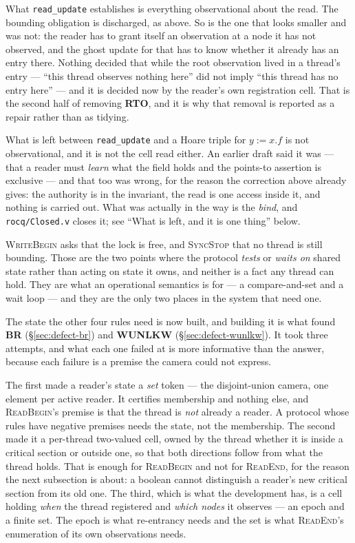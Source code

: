 What \texttt{read\_update} establishes is everything observational about the
read.  The bounding obligation is discharged, as above.  So is the one that
looks smaller and was not: the reader has to grant itself an observation at a
node it has not observed, and the ghost update for that has to know whether it
already has an entry there.  Nothing decided that while the root observation
lived in a thread's entry --- ``this thread observes nothing here'' did not
imply ``this thread has no entry here'' --- and it is decided now by the
reader's own registration cell.  That is the second half of removing
\textbf{RTO}, and it is why that removal is reported as a repair rather than as
tidying.

What is left between \texttt{read\_update} and a Hoare triple for $y := x.f$ is
not observational, and it is not the cell read either.  An earlier draft said
it was --- that a reader must \emph{learn} what the field holds and the
points-to assertion is exclusive --- and that too was wrong, for the reason the
correction above already gives: the authority is in the invariant, the read is
one access inside it, and nothing is carried out.  What was actually in the way
is the \emph{bind}, and \texttt{rocq/Closed.v} closes it; see
``What is left, and it is one thing'' below.

\textsc{WriteBegin} asks that the lock is free, and \textsc{SyncStop} that no
thread is still bounding.  Those are the two points where the protocol
\emph{tests} or \emph{waits on} shared state rather than acting on state it
owns, and neither is a fact any thread can hold.  They are what an operational
semantics is for --- a compare-and-set and a wait loop --- and they are the only
two places in the system that need one.

The state the other four rules need is now built, and building it is what found
\textbf{BR} (\S\ref{sec:defect-br}) and \textbf{WUNLKW}
(\S\ref{sec:defect-wunlkw}).  It took three attempts, and what each one failed
at is more informative than the answer, because each failure is a premise the
camera could not express.

The first made a reader's state a \emph{set} token --- the disjoint-union
camera, one element per active reader.  It certifies membership and nothing
else, and \textsc{ReadBegin}'s premise is that the thread is \emph{not} already
a reader.  A protocol whose rules have negative premises needs the state, not
the membership.  The second made it a per-thread two-valued cell, owned by the
thread whether it is inside a critical section or outside one, so that both
directions follow from what the thread holds.  That is enough for
\textsc{ReadBegin} and not for \textsc{ReadEnd}, for the reason the next
subsection is about: a boolean cannot distinguish a reader's new critical
section from its old one.  The third, which is what the development has, is a
cell holding \emph{when} the thread registered and \emph{which nodes} it
observes --- an epoch and a finite set.  The epoch is what re-entrancy needs and
the set is what \textsc{ReadEnd}'s enumeration of its own observations needs.

